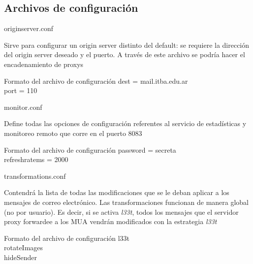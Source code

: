 \documentclass{beamer}
\begin{document}
\subsection{Archivos de configuración}

\begin{frame}{origin\textunderscore server.conf}

\par Sirve para configurar un origin server distinto del default: se requiere la dirección del origin server deseado y el puerto. A través de este archivo se podría hacer el encadenamiento de proxys\\[0.5cm]

\begin{block}{Formato del archivo de configuración}
dest = mail.itba.edu.ar\\
port = 110\\
\end{block}


\end{frame}

\begin{frame}{monitor.conf}

\par Define todas las opciones de configuración referentes al servicio de estadísticas y monitoreo remoto que corre en el puerto 8083\\[0.5cm]

\begin{block}{Formato del archivo de configuración}
password = secreta\\
refresh\textunderscore rate\textunderscore ms = 2000

\end{block}

\end{frame}

\begin{frame}{transformations.conf}

\par Contendrá la lista de todas las modificaciones que se le deban aplicar a los mensajes de correo electrónico. Las transformaciones funcionan de manera global (no por usuario). Es decir, si se activa \textit{l33t}, todos los mensajes que el servidor proxy forwardee a los MUA vendrán modificados con la estrategia \textit{l33t}\\[0.5cm]

\begin{block}{Formato del archivo de configuración}
l33t\\
rotateImages\\
hideSender\\
\end{block}

\end{frame}
\end{document}
